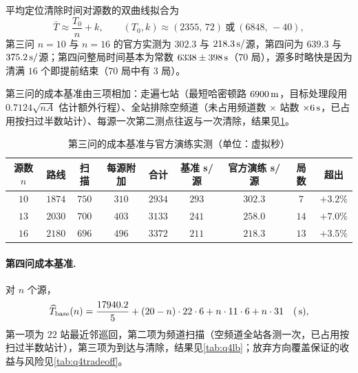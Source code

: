 \begin{appendices}
平均定位清除时间对源数的双曲线拟合为
\begin{equation}\label{eq:denominator}
  \bar T\approx\frac{T_0}{n}+k,\qquad
  (T_0,k)\approx(2355,\,72)\ \text{或}\ (6848,\,-40),
\end{equation}
第三问 $n=10$ 与 $n=16$ 的官方实测为 $302.3$ 与 $218.3\,\mathrm{s}/$源，第四问为 $639.3$ 与 $375.2\,\mathrm{s}/$源；第四问整局时间基本为常数 $6338\pm398\,\mathrm{s}$（$70$ 局），源多时略快是因为清满 $16$ 个即提前结束（$70$ 局中有 $3$ 局）。

第三问的成本基准由三项相加：走遍七站（最短哈密顿路 $6900\,\mathrm{m}$，目标处理段用 $0.7124\sqrt{nA}$ 估计额外行程）、全站排除空频道（未占用频道数 $\times$ 站数 $\times6\,\mathrm{s}$，已占用按扫过半数站计）、每源一次第二测点往返与一次清除，结果见\cref{tab:q3lb}。

\begin{table}[!htbp]
  \caption{第三问的成本基准与官方演练实测（单位：虚拟秒）}\label{tab:q3lb}\centering
  \begin{tabular}{ccccccccc}
    \toprule[1.5pt]
    源数 $n$ & 路线 & 扫描 & 每源附加 & 合计 & 基准 s/源 & 官方演练 s/源 & 局数 & 超出 \\
    \midrule[1pt]
    $10$ & $1874$ & $750$ & $310$ & $2934$ & $293$ & $302.3$ & $7$  & $+3.2\%$ \\
    $13$ & $2030$ & $700$ & $403$ & $3133$ & $241$ & $258.0$ & $14$ & $+7.0\%$ \\
    $16$ & $2180$ & $696$ & $496$ & $3372$ & $211$ & $218.3$ & $13$ & $+3.5\%$ \\
    \bottomrule[1.5pt]
  \end{tabular}
\end{table}

\paragraph{第四问成本基准.} 对 $n$ 个源，
\begin{equation}\label{eq:q4base}
  \widehat T_{\rm base}(n)=\frac{17940.2}{5}+(20-n)\cdot22\cdot6+n\cdot11\cdot6+n\cdot31\quad(\,\mathrm{s}),
\end{equation}
第一项为 $22$ 站最近邻巡回，第二项为频道扫描（空频道全站各测一次，已占用按扫过半数站计），第三项为到达与清除，结果见\cref{tab:q4lb}；放弃方向覆盖保证的收益与风险见\cref{tab:q4tradeoff}。


\end{appendices}
